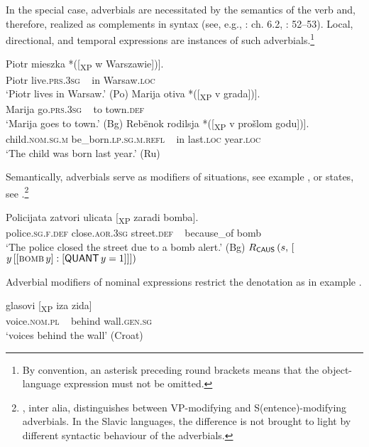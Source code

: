 \documentclass[output=paper]{langscibook}
\begin{document}
\noindent In the special case, adverbials are necessitated by the semantics of the verb and, therefore, realized as complements in syntax (see, e.g., \citealt{Steube1988}: ch. 6.2, \citealt{Werkmann2003}: 52--53). Local, directional, and temporal expressions are instances of such adverbials.\footnote{By convention, an asterisk preceding round brackets means that the object-language expression must not be omitted.}

\ea%
    \label{ex:junghanns:35}
\gll Piotr \minsp{[} mieszka *([\textsubscript{XP} w Warszawie])].\\
  Piotr {} live.\textsc{prs.3sg} ~ in Warsaw.\textsc{loc}\\
    \glt ‘Piotr lives in Warsaw.’ \hfill (Po)
\ex%
    \label{ex:junghanns:36}
\gll Marija \minsp{[} otiva *([\textsubscript{XP} v grada])].\\
  Marija {} go.\textsc{prs.3sg} ~ to town.\textsc{def}\\
    \glt ‘Marija goes to town.’ \hfill (Bg)
\ex%
    \label{ex:junghanns:37}
\gll Rebënok \minsp{[} rodilsja *([\textsubscript{XP} v prošlom godu])].\\
  child.\textsc{nom.sg.m} {} be\_born.\textsc{lp.sg.m.refl} ~ in last.\textsc{loc} year.\textsc{loc}\\
    \glt ‘The child was born last year.’ \hfill (Ru)
\z

\newpage
\noindent Semantically, adverbials serve as modifiers of situations, see example , or states, see .\footnote{\citet{bartsch1972adverbialsemantik}, inter alia, distinguishes between VP-modifying and S(entence)-modifying adverbials. In the Slavic languages, the difference is not brought to light by different syntactic behaviour of the adverbials.}

\ea%
    \label{ex:junghanns:38}
  \ea \gll   Policijata zatvori ulicata [\textsubscript{XP} zaradi bomba].\\
    police.\textsc{sg.f.def} close\textsc{.aor.3sg} street\textsc{.def} ~  because\_of bomb\\
    \glt ‘The police closed the street due to a bomb alert.’ \hfill (Bg)
  \ex $R\textsubscript{\cnstx{caus}} \,  (s, \, [${\exists}$y \, [[\textsc{bomb} \, y] : [\cnstx{quant} \, y = 1]]])$
\z
\z

\noindent Adverbial modifiers of nominal expressions restrict the denotation as in example .

\ea%
    \label{ex:junghanns:39}
  \ea \gll   glasovi [\textsubscript{XP} iza zida]\\
    voice.\textsc{nom.pl} ~ behind wall.\textsc{gen.sg}\\
    \glt ‘voices behind the wall’ 
    \hfill{(Croat)}
\end{document}
